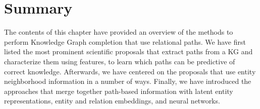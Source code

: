 
\section{Summary}\label{sec:path-summary}
The contents of this chapter have provided an overview of the methods to perform Knowledge Graph completion that use relational paths. We have first listed the most prominent scientific proposals that extract paths from a KG and characterize them using features, to learn which paths can be predictive of correct knowledge. Afterwards, we have centered on the proposals that use entity neighborhood information in a number of ways. Finally, we have introduced the approaches that merge together path-based information with latent entity representations, entity and relation embeddings, and neural networks.